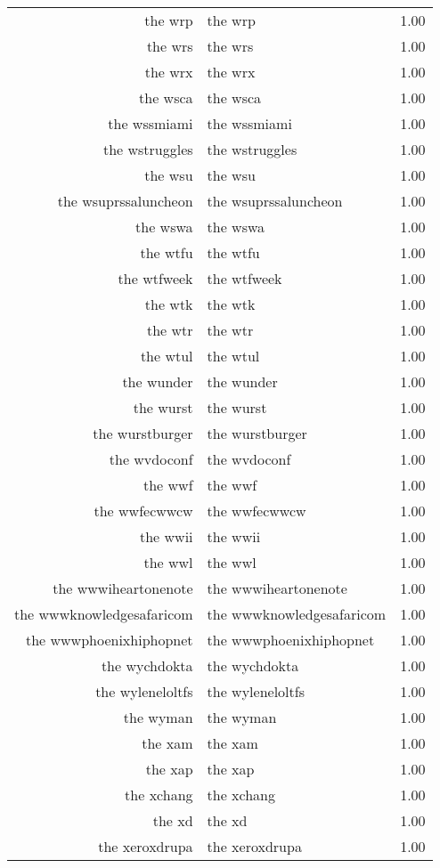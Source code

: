 \begin{table}[ht]
\begin{tabular}{rlr}
  the wrp & the wrp & 1.00 \\ 
  the wrs & the wrs & 1.00 \\ 
  the wrx & the wrx & 1.00 \\ 
  the wsca & the wsca & 1.00 \\ 
  the wssmiami & the wssmiami & 1.00 \\ 
  the wstruggles & the wstruggles & 1.00 \\ 
  the wsu & the wsu & 1.00 \\ 
  the wsuprssaluncheon & the wsuprssaluncheon & 1.00 \\ 
  the wswa & the wswa & 1.00 \\ 
  the wtfu & the wtfu & 1.00 \\ 
  the wtfweek & the wtfweek & 1.00 \\ 
  the wtk & the wtk & 1.00 \\ 
  the wtr & the wtr & 1.00 \\ 
  the wtul & the wtul & 1.00 \\ 
  the wunder & the wunder & 1.00 \\ 
  the wurst & the wurst & 1.00 \\ 
  the wurstburger & the wurstburger & 1.00 \\ 
  the wvdoconf & the wvdoconf & 1.00 \\ 
  the wwf & the wwf & 1.00 \\ 
  the wwfecwwcw & the wwfecwwcw & 1.00 \\ 
  the wwii & the wwii & 1.00 \\ 
  the wwl & the wwl & 1.00 \\ 
  the wwwiheartonenote & the wwwiheartonenote & 1.00 \\ 
  the wwwknowledgesafaricom & the wwwknowledgesafaricom & 1.00 \\ 
  the wwwphoenixhiphopnet & the wwwphoenixhiphopnet & 1.00 \\ 
  the wychdokta & the wychdokta & 1.00 \\ 
  the wyleneloltfs & the wyleneloltfs & 1.00 \\ 
  the wyman & the wyman & 1.00 \\ 
  the xam & the xam & 1.00 \\ 
  the xap & the xap & 1.00 \\ 
  the xchang & the xchang & 1.00 \\ 
  the xd & the xd & 1.00 \\ 
  the xeroxdrupa & the xeroxdrupa & 1.00 \\ 

\end{tabular}
\end{table}
